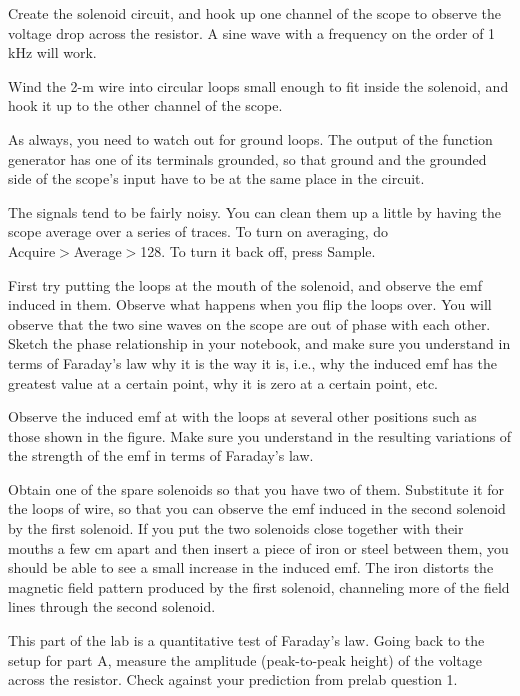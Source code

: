Create the solenoid circuit, and hook up one channel of the
scope to observe the voltage drop across the  resistor.
A sine wave with a frequency on the order of 1 kHz will work.

Wind the 2-m wire into circular loops small enough to fit
inside the solenoid, and hook it up to the other channel of the scope.


As always, you need to watch out for ground loops. The output
of the function generator has one of its terminals grounded,
so that ground and the grounded side of the scope's input have
to be at the same place in the circuit.

The signals tend to be fairly noisy. You can clean them up
a little by having the scope average over a series of traces.
To turn on averaging, do\\
 Acquire$>$Average$>$128. To turn it back
off, press Sample.

First try putting the loops at the mouth of the solenoid,
and observe the emf induced in them. Observe what happens
when you flip the loops over. You will observe that the two
sine waves on the scope are out of phase with each other.
Sketch the phase relationship in your notebook, and make
sure you understand in terms of Faraday's law why it is the
way it is, i.e., why the induced emf has the greatest value
at a certain point, why it is zero at a certain point, etc.

Observe the induced emf at with the loops at several other
positions such as those shown in the figure. Make sure you
understand in the resulting variations of the strength of
the emf in terms of Faraday's law.


Obtain one of the spare solenoids so that you have two of
them. Substitute it for the loops of wire, so that you can
observe the emf induced in the second solenoid by the first
solenoid. If you put the two solenoids close together with
their mouths a few cm apart and then insert a piece of iron
or steel between them, you should be able to see a small
increase in the induced emf. The iron distorts the magnetic
field pattern produced by the first solenoid, channeling
more of the field lines through the second solenoid.


This part of the lab is a quantitative test of Faraday's
law. Going back to the setup for part A, measure the
amplitude (peak-to-peak height) of the voltage across the
resistor. Check against your prediction from prelab question 1.

